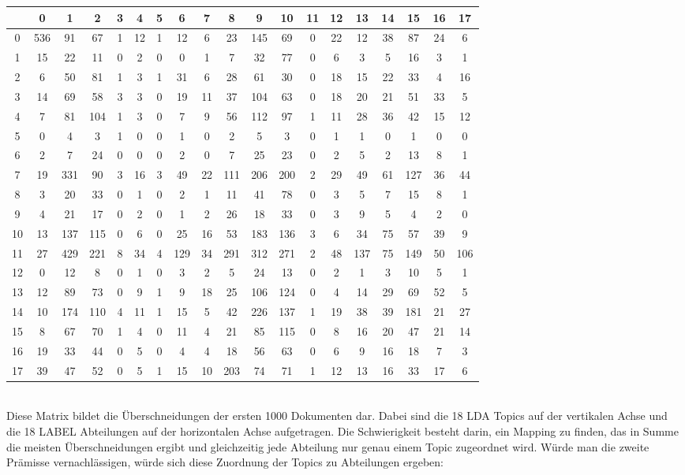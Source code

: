 \documentclass[german,version-2020-11]{uzl-thesis}
\begin{document}
\begin{enumerate}
\begin{center}
\begin{tabular}{ccccccccccccccccccc}
\hline
\hline 
&0&1&2&3&4&5&6&7&8&9&10&11&12&13&14&15&16&17\\
\hline
0&536& 91& 67& 1& 12& 1& 12& 6& 23& 145& 69& 0& 22& 12& 38& 87& 24& 6\\
\hline
1&15& 22& 11& 0& 2& 0& 0& 1& 7& 32& 77& 0& 6& 3& 5& 16& 3& 1\\ 
\hline
2&6& 50& 81& 1& 3& 1& 31& 6& 28& 61& 30& 0& 18& 15& 22& 33& 4& 16\\
\hline
3&14& 69& 58& 3& 3& 0& 19& 11& 37& 104& 63& 0& 18& 20& 21& 51& 33& 5\\
\hline
4&7& 81& 104& 1& 3& 0& 7& 9& 56& 112& 97& 1& 11& 28& 36& 42& 15& 12\\ 
\hline
5&0& 4& 3& 1& 0& 0& 1& 0& 2& 5& 3& 0& 1& 1& 0& 1& 0& 0\\
\hline
6&2& 7& 24& 0& 0& 0& 2& 0& 7& 25& 23& 0& 2& 5& 2& 13& 8& 1\\ 
\hline
7&19& 331& 90& 3& 16& 3& 49& 22& 111& 206& 200& 2& 29& 49& 61& 127& 36& 44\\ 
\hline
8&3& 20& 33& 0& 1& 0& 2& 1& 11& 41& 78& 0& 3& 5& 7& 15& 8& 1\\
\hline
9&4& 21& 17& 0& 2& 0& 1& 2& 26& 18& 33& 0& 3& 9& 5& 4& 2& 0\\
\hline
10&13& 137& 115& 0& 6& 0& 25& 16& 53& 183& 136& 3& 6& 34& 75& 57& 39& 9\\ 
\hline
11&27& 429& 221& 8& 34& 4& 129& 34& 291& 312& 271& 2& 48& 137& 75& 149& 50& 106\\ 
\hline
12&0& 12& 8& 0& 1& 0& 3& 2& 5& 24& 13& 0& 2& 1& 3& 10& 5& 1\\ 
\hline
13&12& 89& 73& 0& 9& 1& 9& 18& 25& 106& 124& 0& 4& 14& 29& 69& 52& 5\\ 
\hline
14&10& 174& 110& 4& 11& 1& 15& 5& 42& 226& 137& 1& 19& 38& 39& 181& 21& 27\\
\hline
15&8& 67& 70& 1& 4& 0& 11& 4& 21& 85& 115& 0& 8& 16& 20& 47& 21& 14\\ 
\hline
16&19& 33& 44& 0& 5& 0& 4& 4& 18& 56& 63& 0& 6& 9& 16& 18& 7& 3\\ 
\hline
17&39& 47& 52& 0& 5& 1& 15& 10& 203& 74& 71& 1& 12& 13& 16& 33& 17& 6\\
\hline
\hline
\end{tabular}
\end{center}\\

Diese Matrix bildet die Überschneidungen der ersten 1000 Dokumenten dar. Dabei sind die 18 LDA Topics auf der vertikalen Achse und die 18 LABEL Abteilungen auf der horizontalen Achse aufgetragen. Die Schwierigkeit besteht darin, ein Mapping zu finden, das in Summe die meisten Überschneidungen ergibt und gleichzeitig jede Abteilung nur genau einem Topic zugeordnet wird. Würde man die zweite Prämisse vernachlässigen, würde sich diese Zuordnung der Topics zu Abteilungen ergeben: \\


\end{enumerate}
\end{document}
